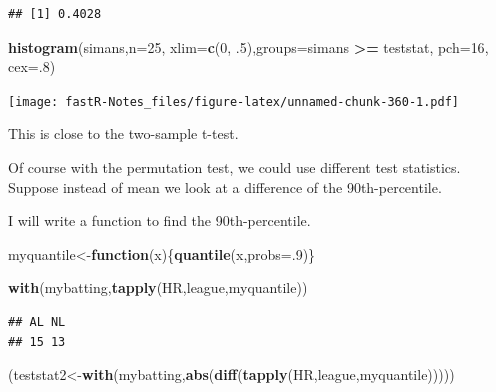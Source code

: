 \documentclass[]{book}
\newenvironment{Shaded}{\begin{snugshade}}{\end{snugshade}}
\newcommand{\KeywordTok}[1]{\textcolor[rgb]{0.13,0.29,0.53}{\textbf{#1}}}
\newcommand{\DataTypeTok}[1]{\textcolor[rgb]{0.13,0.29,0.53}{#1}}
\newcommand{\DecValTok}[1]{\textcolor[rgb]{0.00,0.00,0.81}{#1}}
\newcommand{\StringTok}[1]{\textcolor[rgb]{0.31,0.60,0.02}{#1}}
\newcommand{\ControlFlowTok}[1]{\textcolor[rgb]{0.13,0.29,0.53}{\textbf{#1}}}
\newcommand{\OperatorTok}[1]{\textcolor[rgb]{0.81,0.36,0.00}{\textbf{#1}}}
\newcommand{\NormalTok}[1]{#1}
\theoremstyle{definition}
\theoremstyle{definition}
\theoremstyle{definition}
\theoremstyle{remark}
\begin{document}
\begin{verbatim}
## [1] 0.4028
\end{verbatim}

\begin{Shaded}
\begin{Highlighting}[]
 \KeywordTok{histogram}\NormalTok{(simans,}\DataTypeTok{n=}\DecValTok{25}\NormalTok{, }\DataTypeTok{xlim=}\KeywordTok{c}\NormalTok{(}\DecValTok{0}\NormalTok{, .}\DecValTok{5}\NormalTok{),}\DataTypeTok{groups=}\NormalTok{simans }\OperatorTok{>=}\StringTok{ }\NormalTok{teststat, }\DataTypeTok{pch=}\DecValTok{16}\NormalTok{, }\DataTypeTok{cex=}\NormalTok{.}\DecValTok{8}\NormalTok{)}
\end{Highlighting}
\end{Shaded}

\texttt{[image: fastR-Notes\_files/figure-latex/unnamed-chunk-360-1.pdf]}

This is close to the two-sample t-test.

Of course with the permutation test, we could use different test
statistics. Suppose instead of mean we look at a difference of the
90th-percentile.

I will write a function to find the 90th-percentile.

\begin{Shaded}
\begin{Highlighting}[]
\NormalTok{myquantile<-}\ControlFlowTok{function}\NormalTok{(x)\{}\KeywordTok{quantile}\NormalTok{(x,}\DataTypeTok{probs=}\NormalTok{.}\DecValTok{9}\NormalTok{)\}}
\end{Highlighting}
\end{Shaded}

\begin{Shaded}
\begin{Highlighting}[]
\KeywordTok{with}\NormalTok{(mybatting,}\KeywordTok{tapply}\NormalTok{(HR,league,myquantile))}
\end{Highlighting}
\end{Shaded}

\begin{verbatim}
## AL NL 
## 15 13
\end{verbatim}

\begin{Shaded}
\begin{Highlighting}[]
\NormalTok{(teststat2<-}\KeywordTok{with}\NormalTok{(mybatting,}\KeywordTok{abs}\NormalTok{(}\KeywordTok{diff}\NormalTok{(}\KeywordTok{tapply}\NormalTok{(HR,league,myquantile)))))}
\end{Highlighting}
\end{Shaded}
\end{document}
